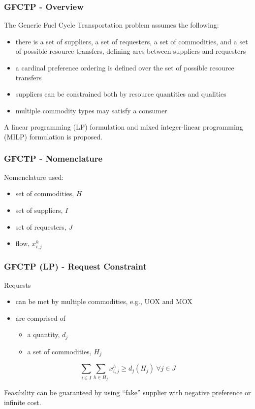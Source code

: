 \begin{frame}[ctb!]
  \frametitle{GFCTP - Overview}
  
  The Generic Fuel Cycle Transportation problem assumes the following:
  \begin{itemize}
    \item there is a set of suppliers, a set of requesters, a set of
      commodities, and a set of possible resource transfers, defining arcs
      between suppliers and requesters
    \item a cardinal preference ordering is defined over the set of possible
      resource transfers
    \item suppliers can be constrained both by resource quantities and qualities
    \item multiple commodity types may satisfy a consumer
  \end{itemize}

  A linear programming (LP) formulation and mixed integer-linear programming
  (MILP) formulation is proposed.

\end{frame}
  

\begin{frame}[ctb!]
  \frametitle{GFCTP - Nomenclature}

  Nomenclature used:
  \begin{itemize}
    \item set of commodities, $H$
    \item set of suppliers, $I$
    \item set of requesters, $J$
    \item flow, $x^h_{i,j}$
  \end{itemize}

\end{frame}

\begin{frame}[ctb!]
  \frametitle{GFCTP (LP) - Request Constraint}
  
  Requests
  \begin{itemize}
    \item can be met by multiple commodities, e.g., UOX and MOX
    \item are comprised of
      \begin{itemize}
        \item a quantity, $d_j$
        \item a set of commodities, $H_j$
      \end{itemize}
  \end{itemize}

  \begin{equation}
    \sum_{i \in I}\sum_{h \in H_{j}} x_{i,j}^{h} \geq d_{j}(H_{j})  \: \forall j \in J
  \end{equation}
  
  Feasibility can be guaranteed by using ``fake'' supplier with negative
  preference or infinite cost.

\end{frame}

